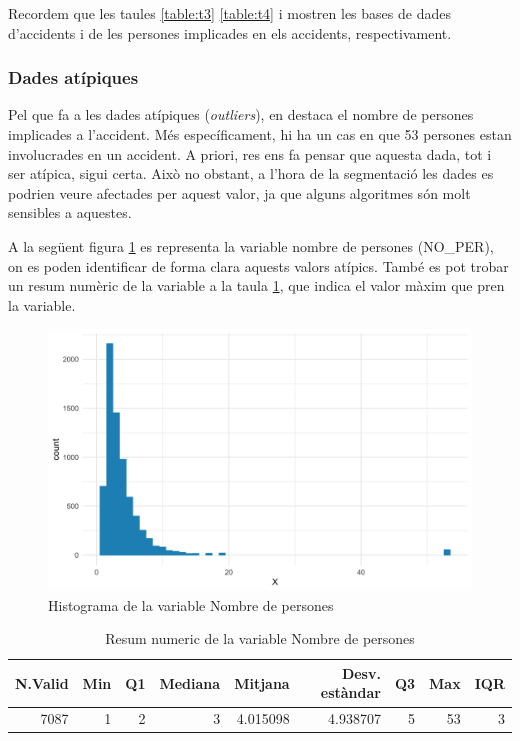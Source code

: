 \documentclass[12pt,longbibliography]{article}
\theoremstyle{definition}
\theoremstyle{remark}
\begin{document}
Recordem que les taules \ref{table:t3} \ref{table:t4} i mostren les bases de dades d'accidents i de les persones implicades en els accidents, respectivament.

\subsubsection{Dades atípiques}

Pel que fa a les dades atípiques (\textit{outliers}), en destaca el nombre de persones implicades a l'accident. Més específicament, hi ha un cas en que 53 persones estan involucrades en un accident. A priori, res ens fa pensar que aquesta dada, tot i ser atípica, sigui certa. Això no obstant, a l'hora de la segmentació les dades es podrien veure afectades per aquest valor, ja que alguns algoritmes són molt sensibles a aquestes.

A la següent figura \ref{fig:F1} es representa la variable nombre de persones (NO\_PER), on es poden identificar de forma clara aquests valors atípics. També es pot trobar un resum numèric de la variable a la taula \ref{table:Fig1a}, que indica el valor màxim que pren la variable.


\begin{figure}[H]
\begin{center}
\includegraphics[width=12.5cm]{Figura1}
\end{center}
\caption{Histograma de la variable Nombre de persones}
\label{fig:F1}
\end{figure}

\begin{table}[H]
\centering
\begin{tabular}{|r|r|r|r|r|r|r|r|r|}
\hline
N.Valid & Min & Q1 & Mediana & Mitjana  & Desv. estàndar & Q3 & Max & IQR \\ \hline
7087    & 1   & 2  & 3       & 4.015098 & 4.938707       & 5  & 53  & 3   \\ \hline
\end{tabular}
\caption{Resum numeric de la variable Nombre de persones \label{table:Fig1a}}
\end{table}
\end{document}
